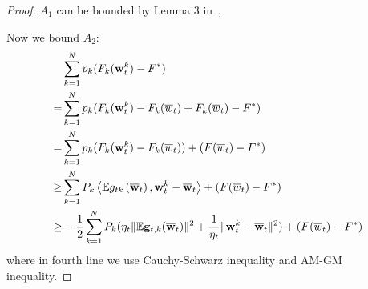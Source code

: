\begin{proof}
$A_1$ can be bounded by Lemma 3 in~\cite{li2019convergence}, 


Now we bound $A_2$:
\begin{align}
	& \sum_{k=1}^N p_k (F_k({\mathbf{w}}_t^k) - F^*) \\
 = & \sum_{k=1}^N p_k (F_k({\mathbf{w}}_t^k) - F_k(\overline{w}_t) + F_k(\overline{w}_t) - F^*) \\
 = & \sum_{k=1}^N p_k (F_k({\mathbf{w}}_t^k) - F_k(\overline{w}_t) ) + (F(\overline{w}_t) - F^*)\\ 
 \geq & \sum_{k=1}^{N} P_{k}\left<\mathbb{E} g_{t k}\left(\overline{{\mathbf{w}}}_{t}\right), {\mathbf{w}}_{t}^k-\overline{{\mathbf{w}}}_{t}\right> + (F(\overline{w}_t) - F^*)\\
 \geq& -\frac{1}{2} \sum_{k=1}^{N} P_{k} (\eta_t \|\mathbb{E} {\mathbf{g}}_{t,k}(\overline{{\mathbf{w}}}_t) \|^2 + \frac{1}{\eta_t} \|{\mathbf{w}}_t^k - \overline{{\mathbf{w}}}_t\|^2) + (F(\overline{w}_t) - F^*) \label{eq:cvxa24}
\end{align}
where in fourth line we use Cauchy-Schwarz inequality and AM-GM inequality. 



\end{proof}
